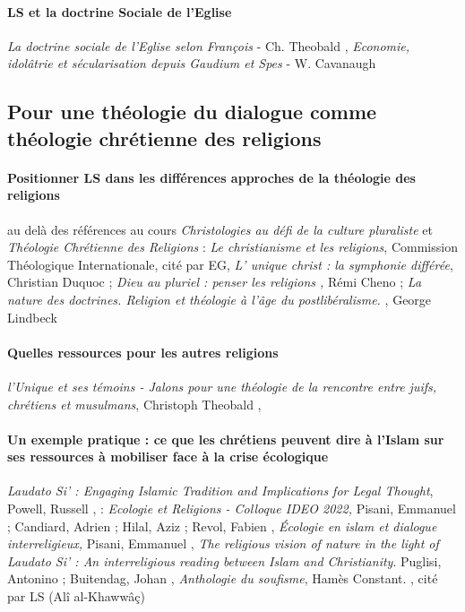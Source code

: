 \paragraph{LS et la doctrine Sociale de l’Eglise} \textit{La doctrine sociale de l’Eglise selon François} - Ch. Theobald \cite{theobald_lenseignement_2016}, \textit{Economie, idolâtrie et sécularisation depuis Gaudium et Spes} - W. Cavanaugh \cite{cavanaugh_fragile_2018}


\subsection{Pour une théologie du dialogue comme théologie chrétienne des religions} 

\paragraph{Positionner LS dans les différences approches de la théologie des religions} au delà des références au cours \textit{Christologies au défi de la culture pluraliste} et \textit{Théologie Chrétienne des Religions} : \textit{Le christianisme et les religions}, Commission Théologique Internationale\cite{commission_theologique_internationale_christianisme_1997}, cité par EG, \textit{L’ unique christ : la symphonie différée}, Christian Duquoc \cite{duquoc_unique_2002}; \textit{Dieu au pluriel : penser les religions ,} Rémi Cheno \cite{cheno_dieu_2017}; \textit{La nature des doctrines. Religion et théologie à l’âge du postlibéralisme. }, George Lindbeck \cite{lindbeck_nature_2002}

\paragraph{Quelles ressources pour les autres religions } \textit{l’Unique et ses témoins - Jalons pour une
théologie de la rencontre entre juifs, chrétiens et musulmans}, Christoph Theobald \cite{theobald_christianisme_2007},  

\paragraph{Un exemple pratique : ce que les chrétiens peuvent dire à l'Islam sur ses ressources à mobiliser face à la crise écologique} \textit{Laudato Si’ : Engaging Islamic Tradition and Implications for Legal Thought}, Powell, Russell \cite{powell_laudato_2017}, : \textit{Ecologie et Religions -
Colloque IDEO 2022,} Pisani, Emmanuel ; Candiard, Adrien ; Hilal, Aziz ; Revol, Fabien \cite{pisani_ecologie_2022}, \textit{Écologie en islam et dialogue interreligieux,} Pisani, Emmanuel \cite{pisani_ecologie_2016}, \textit{The religious vision of nature in the light of Laudato
Si’ : An interreligious reading between Islam and Christianity}. Puglisi, Antonino ; Buitendag, Johan \cite{puglisi_religious_2020}, \textit{Anthologie du soufisme}, Hamès Constant. \cite{hames_vitray-meyerovitch_1988}, cité par LS (Alî al-Khawwâç)

